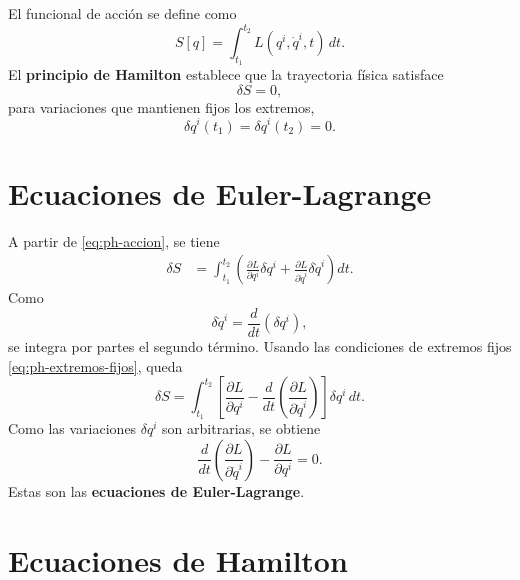 \documentclass[../apunte_mecanica_clasica.tex]{subfiles}%
\begin{document}
El funcional de acción se define como
\begin{equation}
    S[q]=\int_{t_1}^{t_2}L(q^i,\dot q^i,t)\,dt.
    \label{eq:ph-accion}
\end{equation}
El \textbf{principio de Hamilton} establece que la trayectoria física satisface
\begin{equation}
    \delta S=0,
    \label{eq:ph-principio-hamilton}
\end{equation}
para variaciones que mantienen fijos los extremos,
\begin{equation}
    \delta q^i(t_1)=\delta q^i(t_2)=0.
    \label{eq:ph-extremos-fijos}
\end{equation}

\section{Ecuaciones de Euler-Lagrange}
\label{sec:ph-euler-lagrange}

A partir de \eqref{eq:ph-accion}, se tiene
\begin{align}
    \delta S
    &= \int_{t_1}^{t_2}\left(
    \frac{\partial L}{\partial q^i}\delta q^i+
    \frac{\partial L}{\partial \dot q^i}\delta \dot q^i
    \right)dt. \label{eq:ph-delta-s-uno}
\end{align}
Como
\begin{equation}
    \delta\dot q^i=\frac{d}{dt}(\delta q^i),
    \label{eq:ph-delta-qdot}
\end{equation}
se integra por partes el segundo término. Usando las condiciones de extremos fijos \eqref{eq:ph-extremos-fijos}, queda
\begin{equation}
    \delta S=\int_{t_1}^{t_2}\left[
    \frac{\partial L}{\partial q^i}-
    \frac{d}{dt}\left(\frac{\partial L}{\partial \dot q^i}\right)
    \right]\delta q^i\,dt.
    \label{eq:ph-delta-s-final}
\end{equation}
Como las variaciones $\delta q^i$ son arbitrarias, se obtiene
\begin{equation}
    \frac{d}{dt}\left(\frac{\partial L}{\partial \dot q^i}\right)-
    \frac{\partial L}{\partial q^i}=0.
    \label{eq:ph-euler-lagrange}
\end{equation}
Estas son las \textbf{ecuaciones de Euler-Lagrange}.

\section{Ecuaciones de Hamilton}
\label{sec:ph-ecuaciones-hamilton}
\end{document}
